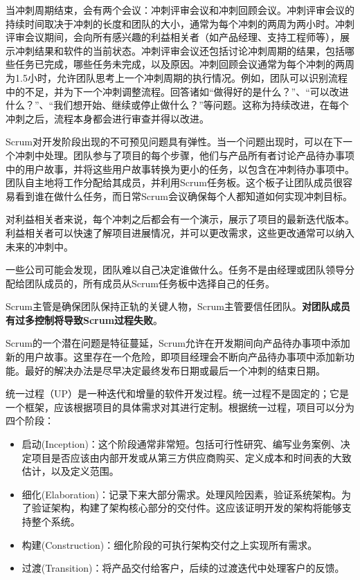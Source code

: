 当冲刺周期结束，会有两个会议：冲刺评审会议和冲刺回顾会议。冲刺评审会议的持续时间取决于冲刺的长度和团队的大小，通常为每个冲刺的两周为两小时。冲刺评审会议期间，会向所有感兴趣的利益相关者（如产品经理、支持工程师等），展示冲刺结果和软件的当前状态。冲刺评审会议还包括讨论冲刺周期的结果，包括哪些任务已完成，哪些任务未完成，以及原因。冲刺回顾会议通常为每个冲刺的两周为1.5小时，允许团队思考上一个冲刺周期的执行情况。例如，团队可以识别流程中的不足，并为下一个冲刺调整流程。回答诸如“做得好的是什么？”、“可以改进什么？”、“我们想开始、继续或停止做什么？”等问题。这称为持续改进，在每个冲刺之后，流程本身都会进行审查并得以改进。


Scrum对开发阶段出现的不可预见问题具有弹性。当一个问题出现时，可以在下一个冲刺中处理。团队参与了项目的每个步骤，他们与产品所有者讨论产品待办事项中的用户故事，并将这些用户故事转换为更小的任务，以包含在冲刺待办事项中。团队自主地将工作分配给其成员，并利用Scrum任务板。这个板子让团队成员很容易看到谁在做什么任务，而日常Scrum会议确保每个人都知道如何实现冲刺目标。

对利益相关者来说，每个冲刺之后都会有一个演示，展示了项目的最新迭代版本。利益相关者可以快速了解项目进展情况，并可以更改需求，这些更改通常可以纳入未来的冲刺中。


一些公司可能会发现，团队难以自己决定谁做什么。任务不是由经理或团队领导分配给团队成员的，所有成员从Scrum任务板中选择自己的任务。

Scrum主管是确保团队保持正轨的关键人物，Scrum主管要信任团队。\textbf{对团队成员有过多控制将导致Scrum过程失败}。

Scrum的一个潜在问题是特征蔓延，Scrum允许在开发期间向产品待办事项中添加新的用户故事。这里存在一个危险，即项目经理会不断向产品待办事项中添加新功能。最好的解决办法是尽早决定最终发布日期或最后一个冲刺的结束日期。


统一过程（UP）是一种迭代和增量的软件开发过程。统一过程不是固定的；它是一个框架，应该根据项目的具体需求对其进行定制。根据统一过程，项目可以分为四个阶段：

\begin{itemize}
\item
启动(Inception)：这个阶段通常非常短。包括可行性研究、编写业务案例、决定项目是否应该由内部开发或从第三方供应商购买、定义成本和时间表的大致估计，以及定义范围。

\item
细化(Elaboration)：记录下来大部分需求。处理风险因素，验证系统架构。为了验证架构，构建了架构核心部分的交付件。这应该证明开发的架构将能够支持整个系统。

\item
构建(Construction)：细化阶段的可执行架构交付之上实现所有需求。

\item
过渡(Transition)：将产品交付给客户，后续的过渡迭代中处理客户的反馈。
\end{itemize}

